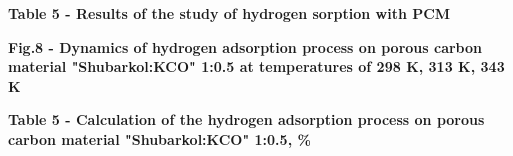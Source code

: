 {\bfseries Table 5 - Results of the study of hydrogen sorption with PCM}



{\bfseries Fig.8 - Dynamics of hydrogen adsorption process on porous
carbon material "Shubarkol:KCO" 1:0.5
at temperatures of 298 K, \hspace{0pt}\hspace{0pt}313 K, 343 K}

{\bfseries Table 5 - Calculation of the hydrogen adsorption process on
porous carbon material "Shubarkol:KCO"
1:0.5, \%}

